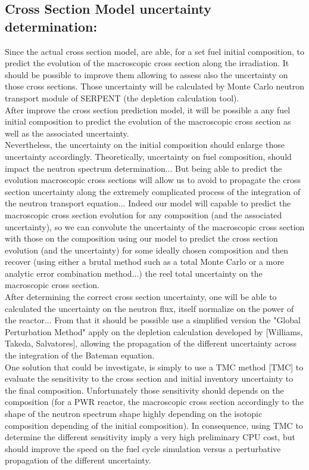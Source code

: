 \documentclass[dvips,12pt]{article}
\begin{document}
\subsection{Cross Section Model uncertainty determination:}
Since the actual cross section model, are able, for a set fuel initial composition, to predict the evolution of the macroscopic cross section along the irradiation. It should be possible to improve them allowing to assess also the uncertainty on those cross sections. Those uncertainty will be calculated by Monte Carlo neutron transport module of SERPENT (the depletion calculation tool). \\

After improve the cross section prediction model, it will be possible a any fuel initial composition to predict the evolution of the macroscopic cross section as well as the associated uncertainty.\\
Nevertheless, the uncertainty on the initial composition should enlarge those uncertainty accordingly. Theoretically, uncertainty on fuel composition, should impact the neutron spectrum determination... But being able to predict the evolution macroscopic cross sections will allow us to avoid to propagate the cross section uncertainty along the extremely complicated process of the integration of the neutron transport equation... Indeed our model will capable to predict the macroscopic cross section evolution for any composition (and the associated uncertainty), so we can convolute the uncertainty of the macroscopic cross section with those on the composition using our model to predict the cross section evolution (and the uncertainty) for some ideally chosen composition and then recover  (using either a brutal method such as a total Monte Carlo or a more analytic error combination method...) the reel total uncertainty on the macroscopic cross section.\\
After determining the correct cross section uncertainty, one will be able to calculated the uncertainty on the neutron flux, itself normalize on the power of the reactor...
From that it should be possible use a simplified version the "Global Perturbation Method"  apply on the depletion calculation developed by [Williams, Takeda, Salvatores], allowing the propagation of the different uncertainty across the integration of the Bateman equation.\\
One solution that could be investigate, is simply to use a TMC method [TMC] to evaluate the sensitivity to the cross section and initial inventory uncertainty to the final composition. Unfortunately those sensitivity should depends on the composition (for a PWR reactor, the macroscopic cross section accordingly to the shape of the neutron spectrum shape highly depending on the isotopic composition depending of the initial composition). In consequence, using TMC to determine the different sensitivity imply a very high preliminary CPU cost, but should improve the speed on the fuel cycle simulation versus a perturbative propagation of the different uncertainty.\\
  
\end{document}
